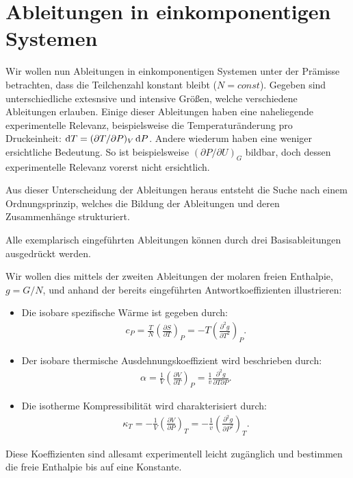 \section{Ableitungen in einkomponentigen Systemen}
	Wir wollen nun Ableitungen in einkomponentigen Systemen unter der Prämisse betrachten, dass die Teilchenzahl konstant bleibt ($N=const$).
	Gegeben sind unterschiedliche extesnsive und intensive Größen, welche verschiedene Ableitungen erlauben. 
	Einige dieser Ableitungen haben eine naheliegende experimentelle Relevanz, beispielsweise die Temperaturänderung pro Druckeinheit: $\mathop{}\!\mathrm{d} T=(\partial T/\partial P)_V\mathop{}\!\mathrm{d} P$. Andere wiederum haben eine weniger ersichtliche Bedeutung. So ist beispielsweise $(\partial P/\partial U)_G$ bildbar, doch dessen experimentelle Relevanz vorerst nicht ersichtlich.

	Aus dieser Unterscheidung der Ableitungen heraus entsteht die Suche nach einem Ordnungsprinzip, welches die Bildung der Ableitungen und deren Zusammenhänge strukturiert.
	\begin{formal}
		Alle exemplarisch eingeführten Ableitungen können durch drei Basisableitungen ausgedrückt werden. 
	\end{formal}
	Wir wollen dies mittels der zweiten Ableitungen der molaren freien Enthalpie, $g=G/N$, und anhand der bereits eingeführten Antwortkoeffizienten illustrieren:
	\begin{itemize}
		\item Die isobare spezifische Wärme ist gegeben durch: 
		\begin{align*}
		c_P=\frac{T}{N}\left(\frac{\partial S}{\partial T}\right)_P=-T\left(\frac{\partial^2g}{\partial T^2}\right)_P.
		\end{align*}
		\item Der isobare thermische Ausdehnungskoeffizient wird beschrieben durch:
		\begin{align*}
			\alpha=\frac{1}{V}\left(\frac{\partial V}{\partial T}\right)_P=\frac{1}{v}\frac{\partial^2g}{\partial T\partial P}.
			\end{align*}
		\item Die isotherme Kompressibilität wird charakterisiert durch:
		\begin{align*}
			\kappa_T=-\frac{1}{V}\left(\frac{\partial V}{\partial P}\right)_T=-\frac{1}{v}\left(\frac{\partial^2g}{\partial P^2}\right)_T.
			\end{align*}
	\end{itemize}
	Diese Koeffizienten sind allesamt experimentell leicht zugänglich und bestimmen die freie Enthalpie bis auf eine Konstante.

